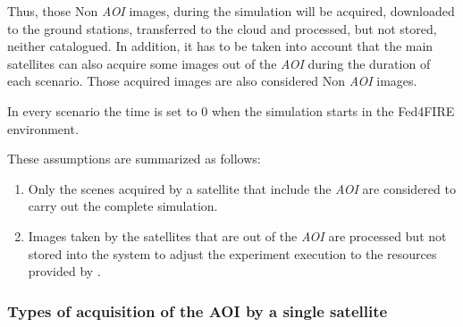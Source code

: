Thus, those Non \emph{AOI} images, during the simulation will be acquired,
downloaded to the ground stations, transferred to the cloud and processed, but
not stored, neither catalogued. In addition, it has to be taken into account
that the main satellites can also acquire some images out of the \emph{AOI}
during the duration of each scenario. Those acquired images are also considered
Non \emph{AOI} images. 

In every scenario the time is set to 0 when the simulation starts in the Fed4FIRE environment.

These assumptions are summarized as follows:
\begin{enumerate}
\item Only the scenes acquired by a satellite that include the \emph{AOI} are considered to carry out the complete simulation.
\item Images taken by the satellites that are out of the \emph{AOI} are processed but
  not stored into the system to adjust the experiment execution to the resources
  provided by \bonfire.
\end{enumerate}

\subsubsection{Types of acquisition of the AOI by a single satellite}
\label{subsubsec:types-acquisition}

